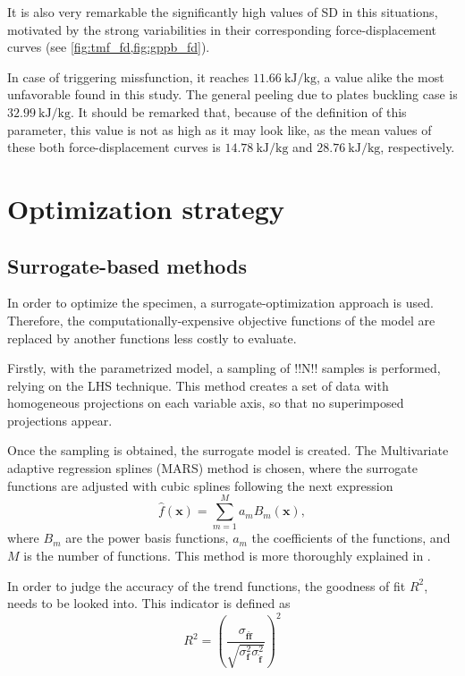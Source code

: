 \documentclass[cmfonts]{witpress}
\begin{document}
It is also very remarkable the significantly high values of SD in this situations, motivated by the strong variabilities in their corresponding force-displacement curves (see \cref{fig:tmf_fd,fig:gppb_fd}).

In case of triggering missfunction, it reaches $\SI{11.66}{\kJ/\kg}$, a value alike the most unfavorable found in this study. The general peeling due to plates buckling case is $\SI{32.99}{\kJ/\kg}$. It should be remarked that, because of the definition of this parameter, this value is not as high as it may look like, as the mean values of these both force-displacement curves is $\SI{14.78}{\kJ/\kg}$ and $\SI{28.76}{\kJ/\kg}$, respectively.

\section{Optimization strategy}

\subsection{Surrogate-based methods}

In order to optimize the specimen, a surrogate-optimization approach is used. Therefore, the computationally-expensive  objective functions of the model are replaced by another functions less costly to evaluate. 

Firstly, with the parametrized model, a sampling of !!N!! samples is performed, relying on the LHS technique. This method creates a set of data with homogeneous projections on each variable axis, so that no superimposed projections appear. 

Once the sampling is obtained, the surrogate model is created. The Multivariate adaptive regression splines (MARS) method is chosen, where the surrogate functions are adjusted with cubic splines following the next expression
\begin{equation}\label{eq:mars}
\hat{f}\left ( \bm{x} \right )= \sum_{m=1}^{M}a_{m}B_{m}\left ( \bm{x} \right ),
\end{equation}
where $B_{m}$ are the power basis functions, $a_{m}$ the coefficients of the functions, and $M$ is the number of functions. This method is more thoroughly explained in \cite{Friedman1995197}. 

In order to judge the accuracy of the trend functions, the goodness of fit $R^2$, needs to be looked into. This indicator is defined as
\begin{equation}\label{eq:correlation_coefficient}
  R^2 = {\left(\dfrac{\sigma_{\bm{f}
\bm{\hat{f}}}}{\sqrt{\sigma_{\bm{f}}^2
\sigma_{\bm{\hat{f}}}^2}}\right)}^2
\end{equation}
\end{document}
